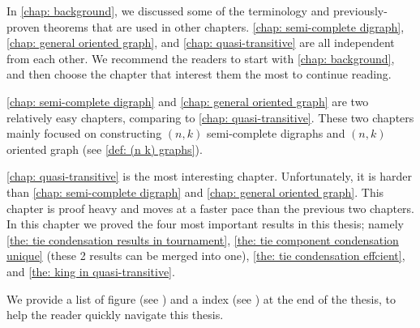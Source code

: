 In \cref{chap: background}, we discussed some of the terminology
and previously-proven theorems that are used in other chapters.
\cref{chap: semi-complete digraph}, \cref{chap: general oriented graph},
and \cref{chap: quasi-transitive} are all independent from each other.
We recommend the readers to start with \cref{chap: background},
and then choose the chapter that interest them
the most to continue reading.

\cref{chap: semi-complete digraph} and \cref{chap: general oriented graph}
are two relatively easy chapters, comparing to \cref{chap: quasi-transitive}.
These two chapters mainly focused on constructing
\((n, k)\) semi-complete digraphs and
\((n, k)\) oriented graph (see \cref{def: (n k) graphs}).

\cref{chap: quasi-transitive} is the most interesting chapter.
Unfortunately, it is harder than
\cref{chap: semi-complete digraph} and \cref{chap: general oriented graph}.
This chapter is proof heavy and
moves at a faster pace than the previous two chapters.
In this chapter we proved the four most important results
in this thesis; namely
\cref{the: tie condensation results in tournament},
\cref{the: tie component condensation unique}
(these 2 results can be merged into one),
\cref{the: tie condensation effcient},
and \cref{the: king in quasi-transitive}.

We provide a list of figure (see )
and a index (see ) at the end of the thesis,
to help the reader quickly navigate this thesis.
